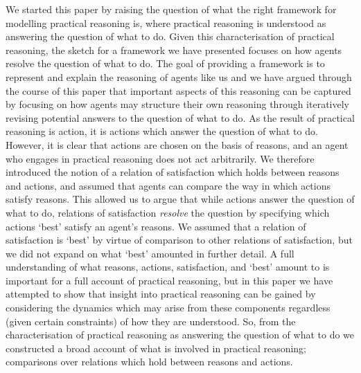 \documentclass[10pt]{article}
\begin{document}
We started this paper by raising the question of what the right framework for modelling practical reasoning is, where practical reasoning is understood as answering the question of what to do.
Given this characterisation of practical reasoning, the sketch for a framework we have presented focuses on how agents resolve the question of what to do.
The goal of providing a framework is to represent and explain the reasoning of agents like us and we have argued through the course of this paper that important aspects of this reasoning can be captured by focusing on how agents may structure their own reasoning through iteratively revising potential answers to the question of what to do.
As the result of practical reasoning is action, it is actions which answer the question of what to do.
However, it is clear that actions are chosen on the basis of reasons, and an agent who engages in practical reasoning does not act arbitrarily.
We therefore introduced the notion of a relation of satisfaction which holds between reasons and actions, and assumed that agents can compare the way in which actions satisfy reasons.
This allowed us to argue that while actions answer the question of what to do, relations of satisfaction \emph{resolve} the question by specifying which actions `best' satisfy an agent's reasons.
We assumed that a relation of satisfaction is `best' by virtue of comparison to other relations of satisfaction, but we did not expand on what `best' amounted in further detail.
A full understanding of what reasons, actions, satisfaction, and `best' amount to is important for a full account of practical reasoning, but in this paper we have attempted to show that insight into practical reasoning can be gained by considering the dynamics which may arise from these components regardless (given certain constraints) of how they are understood.
So, from the characterisation of practical reasoning as answering the question of what to do we constructed a broad account of what is involved in practical reasoning; comparisons over relations which hold between reasons and actions.
\end{document}
